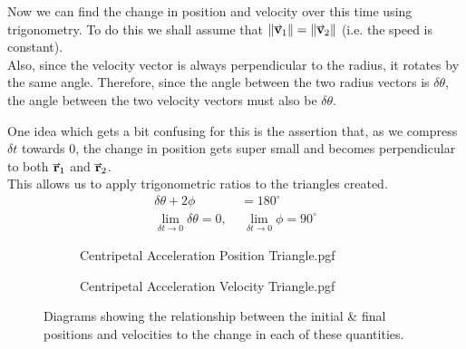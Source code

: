 \documentclass[main.tex]{subfiles}
\begin{document}
                    Now we can find the change in position and velocity over this time using trigonometry. To do this we shall assume that $\vmod{\vect{v}_1} = \vmod{\vect{v}_2}$ (i.e. the speed is constant).\\
                    Also, since the velocity vector is always perpendicular to the radius, it rotates by the same angle. Therefore, since the angle between the two radius vectors is $\delta \theta$, the angle between the two velocity vectors must also be $\delta \theta$.

                    One idea which gets a bit confusing for this is the assertion that, as we compress $\delta t$ towards $0$, the change in position gets super small and becomes perpendicular to both $\vect{r}_1$ and $\vect{r}_2$.\\
                    This allows us to apply trigonometric ratios to the triangles created.
                    \begin{align}
                        \delta \theta + 2\phi &= 180^{\circ} \nonumber \\[-1em]
                        \lim_{\delta t \to 0} \delta \theta = 0, \ & \ \lim_{\delta t \to 0} \phi = 90^{\circ} \nonumber
                    \end{align}
                    \vspace{-1.5em}
                    \begin{figure}[!h]
                        \centering
                        \begin{subfigure}[t]{0.45\textwidth}
                            \centering
                            \scalebox{0.9}
                            {
                                \begin{adjustbox}{clip,trim=35mm 50mm 20mm 30mm}
                                    {{Centripetal Acceleration Position Triangle.pgf}}
                                \end{adjustbox}
                            }
                        \end{subfigure}
                        \hfill
                        \begin{subfigure}[t]{0.45\textwidth}
                            \centering
                            \scalebox{0.9}
                            {
                                \begin{adjustbox}{clip,trim=35mm 45mm 15mm 40mm}
                                    {{Centripetal Acceleration Velocity Triangle.pgf}}
                                \end{adjustbox}
                            }
                            
                        \end{subfigure}
                        \vspace{-5mm}
                        \caption{Diagrams showing the relationship between the initial \& final positions and velocities to the change in each of these quantities.}
                        \label{fig: Centripetal Triangle Diagrams}
                    \end{figure}
\end{document}
